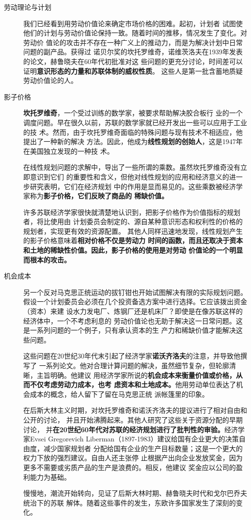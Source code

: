 \begin{description}
\item[劳动理论与计划] 我们已经看到用劳动价值论来确定市场价格的困难。起初，计划者
  试图使他们的计划与劳动价值论保持一致。随着时间的推移，情况发生了变化。对劳动价
  值论的攻击并不存在一种广义上的推动力，而是为解决计划中日常问题的副产品。获得过
  诺贝尔奖的坎托罗维奇，诺维茨洛夫在1939年发表的论文，赫鲁晓夫在60年代初批准对这
  些问题的更充分讨论，时间差可以证明\textbf{意识形态的力量和苏联体制的威权性质}。
  这些人是第一批含蓄地质疑劳动价值论的人。

\item[影子价格] \textbf{坎托罗维奇}，一个受过训练的数学家，被要求帮助解决胶合板行
  业的一个调度问题。早在很久以前，苏联的数学家就已经开发出一些可以应用于工业的技
  术。然而，由于坎托罗维奇面临的特殊问题与现有技术不相适应，他提出了一种新的解决
  方法。因此，他成为\textbf{线性规划的创始人}，这是1947年在美国独立发现的一种技
  术。

  在线性规划问题的求解中，导出了一些所谓的乘数。虽然坎托罗维奇没有立即意识到它们
  的重要性和含义，但他对线性规划的应用和经济意义的进一步研究表明，它们在经济规划
  中的作用是显而易见的。这些乘数被经济学家称为\textbf{影子价格，它们反映了商品的
    稀缺价值。}

  许多苏联经济学家很快就清楚地认识到，把影子价格作为价值指标的规划者，将比使用由
  计划委员会制定的、源自某种意识形态和权利性的价格的规划者，实现更有效的资源配置。
  其他人同样迅速地发现，线性规划产生的影子价格意味着\textbf{相对价格不仅是劳动力
    时间的函数，而且还取决于资本和土地的稀缺性价值。因此，影子价格的使用是对劳动
    价值论的一个明显而根本的攻击。}

\item[机会成本] 另一个反对马克思正统运动的拔钉钳也开始试图解决有限的实际规划问题。
  假设一个计划委员会必须在几个投资备选方案中进行选择。它应该拨出资金（资本）来建
  设水力发电厂、炼钢厂还是机床厂？即使是在像苏联这样的经济体中，一个不考虑利息的
  劳动价值论也无助于解决这一日常问题。这是一系列问题的一个例子，只有承认资本的生
  产力和稀缺价值才能解决这些问题。

  这些问题在20世纪30年代末引起了经济学家\textbf{诺沃齐洛夫}的注意，并导致他撰写了
  一系列论文。他对合理计算问题的解决，虽然细节复杂，但轮廓清晰，主旨明确。他建议
  用经济学家所说的\textbf{机会成本来衡量价值或价格，从而不仅考虑劳动力成本，也考
    虑资本和土地成本。}他用劳动单位表达了机会成本的概念，给人留下了留在马克思正统
  派帐篷里的印象。

  在后斯大林主义时期，对坎托罗维奇和诺沃齐洛夫的提议进行了相对自由和公开的讨论，
  并且开始沸腾起来。其他人研究了这些关于资源分配的早期讨论，
  并\textbf{在20世纪60年代对苏联的经济规划进行了批判性的审验。}经济学家Evsei
  Gregorevich Liberman（1897-1983）建议给国有企业更大的决策自由度，减少国家规划者
  分配给国有企业的生产目标数量；这是一个更大的权力下放的强烈建议。自由人还主张停
  止根据产出向企业发放奖金，因为更多不需要或劣质产品的生产是浪费的。相反，他建议
  奖金应以公司的盈利能力为基础。

  慢慢地，潮流开始转向，见证了后斯大林时期、赫鲁晓夫时代和戈尔巴乔夫统治下的苏联
  解体。随着这些事件的发生，东欧许多国家发生了深刻的变化。
\end{description}

